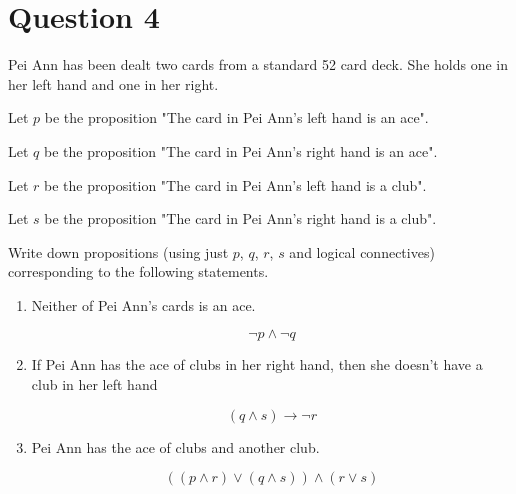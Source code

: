 \documentclass[11pt]{article}
\begin{document}
\section*{Question 4}

Pei Ann has been dealt two cards from a standard 52 card deck. She holds one in her left hand and one in her right.  

Let $p$ be the proposition "The card in Pei Ann's left hand is an ace".

Let $q$ be the proposition "The card in Pei Ann's right hand is an ace".

Let $r$ be the proposition "The card in Pei Ann's left hand is a club".

Let $s$ be the proposition "The card in Pei Ann's right hand is a club".

Write down propositions (using just $p$, $q$, $r$, $s$ and logical connectives) corresponding to the following statements.

\begin{enumerate}[label=(\roman*)]

\item Neither of Pei Ann's cards is an ace.

$$\neg p \land \neg q$$

\item If Pei Ann has the ace of clubs in her right hand, then she doesn't have a club in her left hand

$$(q \land s) \to \neg r $$

\item Pei Ann has the ace of clubs and another club.

$$((p \land r) \lor (q \land s)) \land (r \lor s) $$

\end{enumerate}
\end{document}
